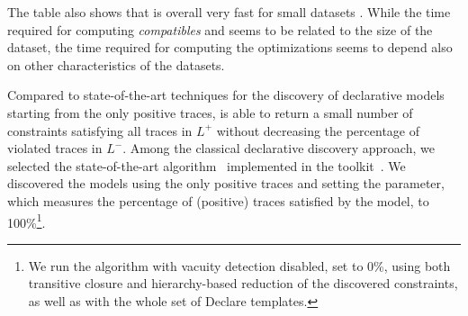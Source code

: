 The table also shows that \nd is overall very fast for small datasets . While the time required for computing \textit{compatibles} and \textit{\sheriff} seems to be related to the size  of the dataset, the time required for computing the optimizations  seems to depend also on other characteristics of the datasets.



Compared to state-of-the-art techniques for the discovery of declarative models starting from the only positive traces, \nd is able to return a small number of constraints satisfying all traces in $L^+$ without decreasing the percentage of violated traces in $L^-$.  
Among the classical declarative discovery approach, we selected the state-of-the-art \declareminer algorithm~\cite{2018a-Maggi} implemented in the \rum toolkit~\cite{2020-Alman}. We discovered the models using the only positive traces and setting the  parameter, which measures the percentage of (positive) traces satisfied by the \declare model, to 100\%\footnote{We run the \declareminer algorithm with vacuity detection disabled,  set to 0\%, using both transitive closure and hierarchy-based reduction of the discovered constraints, as well as with the whole set of Declare templates.}.

